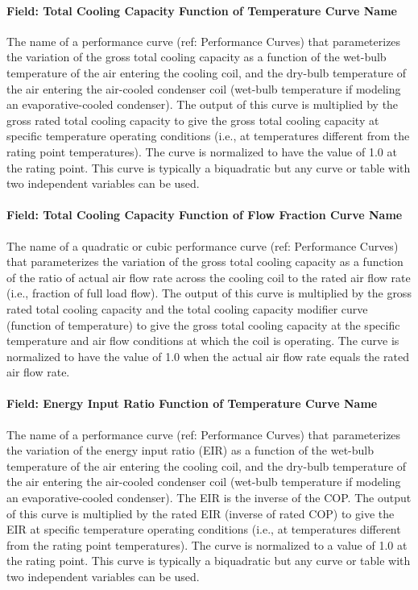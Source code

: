 \paragraph{Field: Total Cooling Capacity Function of Temperature Curve Name}\label{field-total-cooling-capacity-function-of-temperature-curve-name}

The name of a performance curve (ref: Performance Curves) that parameterizes the variation of the gross total cooling capacity as a function of the wet-bulb temperature of the air entering the cooling coil, and the dry-bulb temperature of the air entering the air-cooled condenser coil (wet-bulb temperature if modeling an evaporative-cooled condenser). The output of this curve is multiplied by the gross rated total cooling capacity to give the gross total cooling capacity at specific temperature operating conditions (i.e., at temperatures different from the rating point temperatures). The curve is normalized to have the value of 1.0 at the rating point. This curve is typically a biquadratic but any curve or table with two independent variables can be used.

\paragraph{Field: Total Cooling Capacity Function of Flow Fraction Curve Name}\label{field-total-cooling-capacity-function-of-flow-fraction-curve-name}

The name of a quadratic or cubic performance curve (ref: Performance Curves) that parameterizes the variation of the gross total cooling capacity as a function of the ratio of actual air flow rate across the cooling coil to the rated air flow rate (i.e., fraction of full load flow). The output of this curve is multiplied by the gross rated total cooling capacity and the total cooling capacity modifier curve (function of temperature) to give the gross total cooling capacity at the specific temperature and air flow conditions at which the coil is operating. The curve is normalized to have the value of 1.0 when the actual air flow rate equals the rated air flow rate.

\paragraph{Field: Energy Input Ratio Function of Temperature Curve Name}\label{field-energy-input-ratio-function-of-temperature-curve-name}

The name of a performance curve (ref: Performance Curves) that parameterizes the variation of the energy input ratio (EIR) as a function of the wet-bulb temperature of the air entering the cooling coil, and the dry-bulb temperature of the air entering the air-cooled condenser coil (wet-bulb temperature if modeling an evaporative-cooled condenser). The EIR is the inverse of the COP. The output of this curve is multiplied by the rated EIR (inverse of rated COP) to give the EIR at specific temperature operating conditions (i.e., at temperatures different from the rating point temperatures). The curve is normalized to a value of 1.0 at the rating point. This curve is typically a biquadratic but any curve or table with two independent variables can be used.

